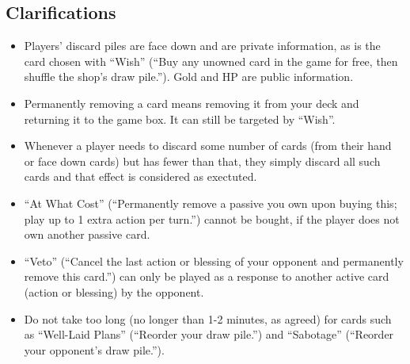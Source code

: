 \documentclass[dvipsnames,parskip,a4paper]{scrartcl}
\begin{document}
\subsection*{Clarifications}

\begin{itemize}
\item Players' discard piles are face down and are private information, as is the card chosen with ``Wish'' (``Buy any unowned card in the game for free, then shuffle the shop's draw pile.''). Gold and HP are public information.
\item Permanently removing a card means removing it from your deck and returning it to the game box. It can still be targeted by ``Wish''.
\item Whenever a player needs to discard some number of cards (from their hand or face down cards) but has fewer than that, they simply discard all such cards and that effect is considered as exectuted.
\item ``At What Cost'' (``Permanently remove a passive you own upon buying this; play up to 1 extra action per turn.'') cannot be bought, if the player does not own another passive card.
\item ``Veto'' (``Cancel the last action or blessing of your opponent and permanently remove this card.'') can only be played as a response to another active card (action or blessing) by the opponent.
\item Do not take too long (no longer than 1-2 minutes, as agreed) for cards such as ``Well-Laid Plans'' (``Reorder your draw pile.'') and ``Sabotage'' (``Reorder your opponent's draw pile.'').
\end{itemize}

\newpage
\end{document}
